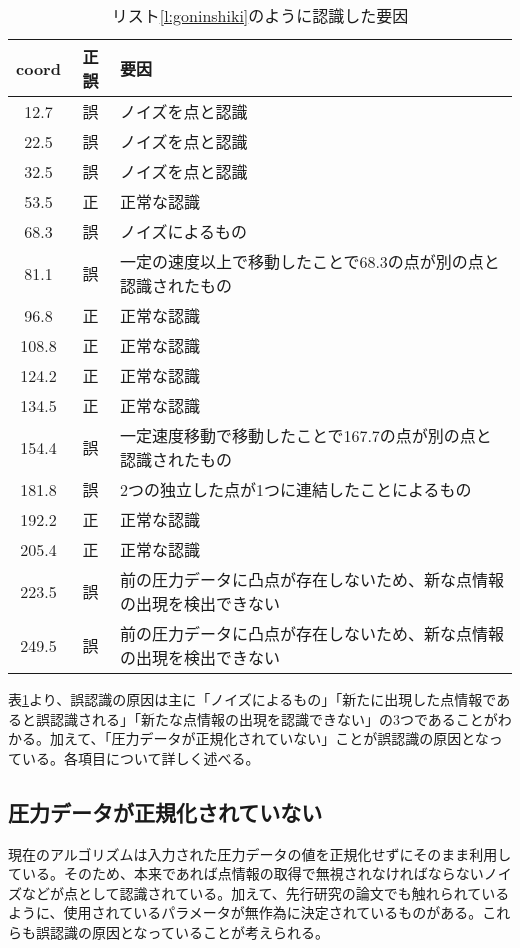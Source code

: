\begin{table}[H]
	\centering
	\caption{リスト\ref{l:goninshiki}のように認識した要因}
	\label{t:goninshiki-riyuu}
	\begin{tabular}{|c|c|l|}
		\hline
		coord&正誤&要因\\
		\hline
		\hline
		12.7&誤&ノイズを点と認識\\
		22.5&誤&ノイズを点と認識\\
		32.5&誤&ノイズを点と認識\\
		53.5&正&正常な認識\\
		68.3&誤&ノイズによるもの\\
		81.1&誤&一定の速度以上で移動したことで68.3の点が別の点と認識されたもの\\
		96.8&正&正常な認識\\
		108.8&正&正常な認識\\
		124.2&正&正常な認識\\
		134.5&正&正常な認識\\
		154.4&誤&一定速度移動で移動したことで167.7の点が別の点と認識されたもの\\
		181.8&誤&2つの独立した点が1つに連結したことによるもの\\
		192.2&正&正常な認識\\
		205.4&正&正常な認識\\
		223.5&誤&前の圧力データに凸点が存在しないため、新な点情報の出現を検出できない\\
		249.5&誤&前の圧力データに凸点が存在しないため、新な点情報の出現を検出できない\\
		\hline
	\end{tabular}
\end{table}
表\ref{t:goninshiki-riyuu}より、誤認識の原因は主に「ノイズによるもの」「新たに出現した点情報であると誤認識される」「新たな点情報の出現を認識できない」の3つであることがわかる。加えて、「圧力データが正規化されていない」ことが誤認識の原因となっている。各項目について詳しく述べる。

\subsection{圧力データが正規化されていない}
現在のアルゴリズムは入力された圧力データの値を正規化せずにそのまま利用している。そのため、本来であれば点情報の取得で無視されなければならないノイズなどが点として認識されている。加えて、先行研究の論文でも触れられているように、使用されているパラメータが無作為に決定されているものがある。これらも誤認識の原因となっていることが考えられる。


